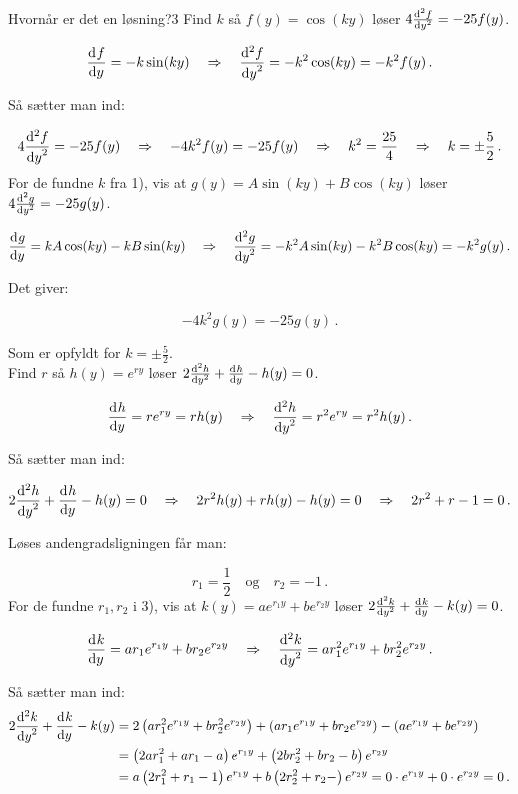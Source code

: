 \begin{opgave}{Hvornår er det en løsning?}{3}
\opg Find $k$ så $f(y) = \cos(ky)$ løser $4 \dif[2]{y}{f} = -25f(y)$.

$$\dif{y}{f} = -k\sin(ky) \quad \Rightarrow \quad \dif[2]{y}{f} = -k^2 \cos(ky) = -k^2 f(y) \, .$$

\vspace{2mm}

Så sætter man ind:

$$4 \dif[2]{y}{f} = -25f(y) \quad \Rightarrow \quad -4k^2 f(y) = -25f(y) \quad \Rightarrow \quad k^2 = \frac{25}{4} \quad \Rightarrow \quad k = \pm \frac{5}{2} \, .$$
\vspace{2mm}
\opg For de fundne $k$ fra 1), vis at $g(y) = A\sin(ky) + B\cos(ky)$ løser $4 \dif[2]{y}{g} = -25g(y)$.

$$\dif{y}{g} = kA\cos(ky) - kB\sin(ky) \quad \Rightarrow \quad \dif[2]{y}{g} = -k^2 A \sin(ky) - k^2 B \cos(ky) = -k^2g(y) \, .$$

\vspace{2mm}

Det giver:

$$-4k^2 g(y) = -25g(y) \, .$$

\vspace{2mm}

Som er opfyldt for $k = \pm \frac{5}{2}$.\\
\opg Find $r$ så $h(y) = e^{ry}$ løser $2 \dif[2]{y}{h} + \dif{y}{h} - h(y) = 0$.

$$\dif{y}{h} = re^{ry} = rh(y) \quad \Rightarrow \quad \dif[2]{y}{h} = r^2 e^{ry} = r^2 h(y) \, .$$

\vspace{2mm}

Så sætter man ind:

$$2 \dif[2]{y}{h} + \dif{y}{h} - h(y) = 0 \quad \Rightarrow \quad 2r^2h(y) + rh(y) -h(y) = 0 \quad \Rightarrow \quad 2r^2+r-1=0 \, .$$
\vspace{2mm}

Løses andengradsligningen får man:

$$r_1 = \frac{1}{2} \quad \text{og} \quad r_2 = -1 \, .$$ 
\vspace{2mm}
\opg For de fundne $r_1,r_2$ i 3), vis at $k(y) = ae^{r_1y} + be^{r_2y}$ løser $2 \dif[2]{y}{k} + \dif{y}{k} - k(y) = 0$.

$$\dif{y}{k} = ar_1e^{r_1y} + br_2e^{r_2y} \quad \Rightarrow \quad \dif[2]{y}{k} = ar_1^2e^{r_1y} + br_2^2e^{r_2y} \, .$$ 
\vspace{2mm}

Så sætter man ind:
\begin{align*}
2 \dif[2]{y}{k} + \dif{y}{k} - k(y) &= 2 \left( ar_1^2e^{r_1y} + br_2^2e^{r_2y}  \right) + \left( ar_1e^{r_1y} + br_2e^{r_2y} \right) - \left( ae^{r_1y} + be^{r_2y} \right)\\
&= \left( 2ar_1^2 + ar_1 - a \right)e^{r_1y} + \left( 2br_2^2 + br_2 - b \right)e^{r_2y} \\
 &= a\left( 2r_1^2 + r_1 - 1 \right)e^{r_1y} + b\left( 2r_2^2 + r_2 -  \right)e^{r_2y} = 0 \cdot e^{r_1y} + 0 \cdot e^{r_2y} = 0 \, .
\end{align*}
\end{opgave}
